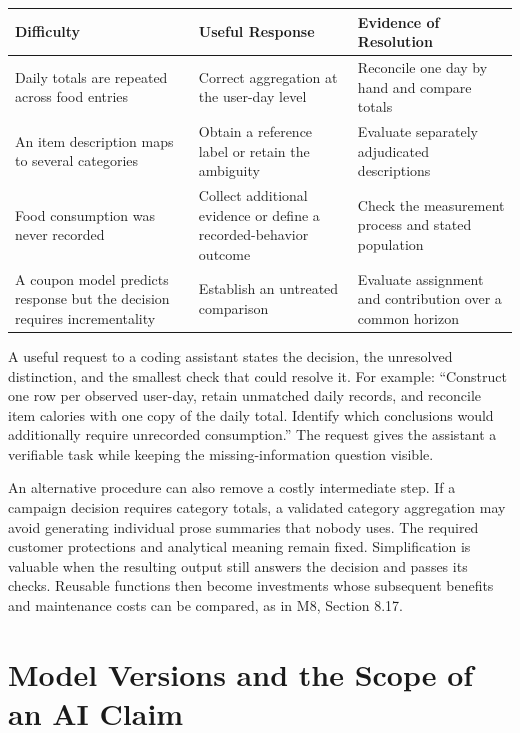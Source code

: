 \begin{table}[H]
\centering\small
\begin{tabular}{@{}
  >{\raggedright\arraybackslash}p{}
  >{\raggedright\arraybackslash}p{}
  >{\raggedright\arraybackslash}p{}@{}}
\toprule
Difficulty & Useful Response & Evidence of Resolution \\
\midrule

Daily totals are repeated across food entries & Correct aggregation at
the user-day level & Reconcile one day by hand and compare totals \\
An item description maps to several categories & Obtain a reference
label or retain the ambiguity & Evaluate separately adjudicated
descriptions \\
Food consumption was never recorded & Collect additional evidence or
define a recorded-behavior outcome & Check the measurement process and
stated population \\
A coupon model predicts response but the decision requires
incrementality & Establish an untreated comparison & Evaluate assignment
and contribution over a common horizon \\
\bottomrule
\end{tabular}
\end{table}

A useful request to a coding assistant states the decision, the
unresolved distinction, and the smallest check that could resolve it.
For example: ``Construct one row per observed user-day, retain unmatched
daily records, and reconcile item calories with one copy of the daily
total. Identify which conclusions would additionally require unrecorded
consumption.'' The request gives the assistant a verifiable task while
keeping the missing-information question visible.

An alternative procedure can also remove a costly intermediate step. If
a campaign decision requires category totals, a validated category
aggregation may avoid generating individual prose summaries that nobody
uses. The required customer protections and analytical meaning remain
fixed. Simplification is valuable when the resulting output still
answers the decision and passes its checks. Reusable functions then
become investments whose subsequent benefits and maintenance costs can
be compared, as in M8, Section 8.17.

\hypertarget{M01-model-versions-and-the-scope-of-an-ai-claim}{%
\section{Model Versions and the Scope of an AI
Claim}\label{M01-model-versions-and-the-scope-of-an-ai-claim}}


